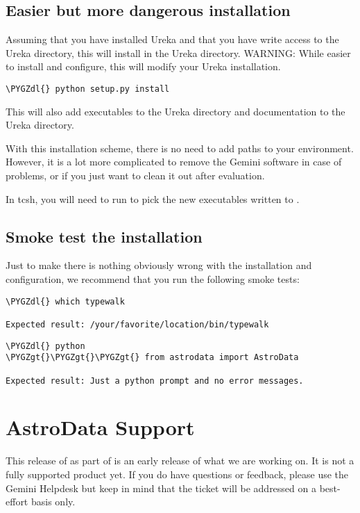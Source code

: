 \documentclass[letterpaper,10pt,english]{sphinxmanual}
\def\PYGZgt{\char`\>}
\def\PYGZdl{\char`\$}
\begin{document}
\subsection{Easier but more dangerous installation}
\label{intro:easier-but-more-dangerous-installation}
Assuming that you have installed Ureka and that you have write access to the Ureka
directory, this will install  in the Ureka  directory.
WARNING: While easier to install and configure, this will modify your Ureka
installation.

\begin{Verbatim}[commandchars=\\\{\}]
\PYGZdl{} python setup.py install
\end{Verbatim}

This will also add executables to the Ureka  directory and documentation to
the Ureka  directory.

With this installation scheme, there is no need to add paths to your environment.
However, it is a lot more complicated to remove the Gemini software in case of
problems, or if you just want to clean it out after evaluation.

In tcsh, you will need to run  to pick the new executables written to .


\subsection{Smoke test the installation}
\label{intro:smoke-test-the-installation}
Just to make there is nothing obviously wrong with the installation and configuration,
we recommend that you run the following smoke tests:

\begin{Verbatim}[commandchars=\\\{\}]
\PYGZdl{} which typewalk

Expected result: /your/favorite/location/bin/typewalk
\end{Verbatim}

\begin{Verbatim}[commandchars=\\\{\}]
\PYGZdl{} python
\PYGZgt{}\PYGZgt{}\PYGZgt{} from astrodata import AstroData

Expected result: Just a python prompt and no error messages.
\end{Verbatim}


\section{AstroData Support}
\label{intro:astrodata-support}
This release of  as part of  is an early release of what
we are working on.  It is not a fully supported product yet.  If you do have questions or
feedback, please use the Gemini Helpdesk but keep in mind that the ticket will be addressed
on a best-effort basis only.
\end{document}
